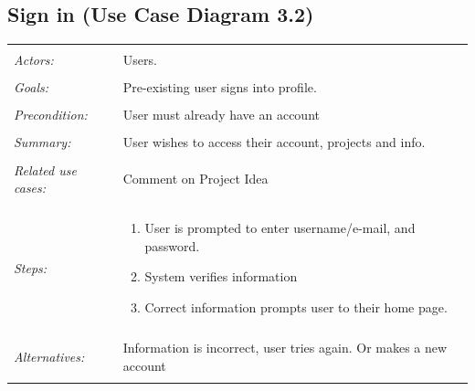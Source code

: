 \documentclass[11pt]{report}
\begin{document}
\subsection{Sign in (Use Case Diagram 3.2)}
    \begin{tabular}{ p{2cm} p{12cm} }
        \hline
        \\
        \textit{Actors:} & Users. \\ 
        \\
        \textit{Goals:} & Pre-existing user signs into profile. \\
        \\
        \textit{Precondition:} & User must already have an account \\
        \\
        \textit{Summary:} & User wishes to access their account, projects and info. \\
        \\
        \textit{Related use cases:} & Comment on Project Idea \\ 
        \\
        \textit{Steps:} & \begin{enumerate}
            \item User is prompted to enter username/e-mail, and password. 
            \item System verifies information
            \item Correct information prompts user to their home page. 
        \end{enumerate} \\
        \\
        \textit{Alternatives:} & Information is incorrect, user tries again. Or makes a new account \\
        \\
        \hline
    \end{tabular}
\end{document}
